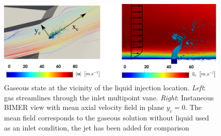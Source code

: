 \begin{figure}[ht]
\centering
\includegraphics[scale=0.225]{./part3_applications/figures_ch8_resolved/gaseous_profile_streamlines_and_vector}
\vspace*{-0.1in}
\caption[Gaseous state at the vicinity of the liquid injection location]{Gaseous state at the vicinity of the liquid injection location. \textsl{Left}: gas streamlines through the inlet multipoint vane.  \textsl{Right}: Instaneous BIMER view with mean axial velocity field in plane $y_c = 0$. The mean field corresponds to the gaseous solution without liquid used as an inlet condition, the jet has been added for comparison}
\label{fig:BIMER_Umean_profile_with_jet}
\end{figure}



